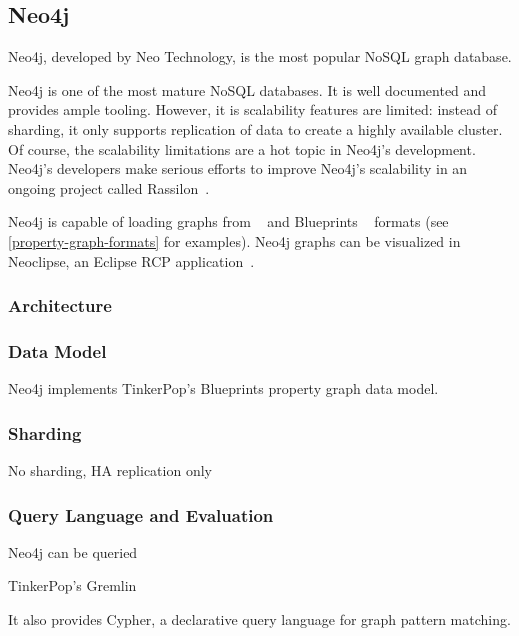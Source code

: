 
\subsection{Neo4j}
\label{neo4j}

Neo4j, developed by Neo Technology, is the most popular NoSQL graph database. 

Neo4j is one of the most mature NoSQL databases. It is well documented and provides ample tooling. However, it is scalability features are limited: instead of sharding, it only supports replication of data to create a highly available cluster. Of course, the scalability limitations are a hot topic in Neo4j's development. Neo4j's developers make serious efforts to improve Neo4j's scalability in an ongoing project called Rassilon~\cite{rassilon}.

Neo4j is capable of loading graphs from \graphml{}~\cite{GraphML} and Blueprints \graphson{}~\cite{BlueprintsGraphSON} formats (see \autoref{property-graph-formats} for examples). Neo4j graphs can be visualized in Neoclipse, an Eclipse RCP application~\cite{Neoclipse}.


\subsubsection{Architecture}


\subsubsection{Data Model}

Neo4j implements TinkerPop's Blueprints property graph data model. 

\subsubsection{Sharding}

No sharding, HA replication only

\subsubsection{Query Language and Evaluation}

Neo4j can be queried 

TinkerPop's Gremlin

It also provides Cypher, a declarative query language for graph pattern matching. 



